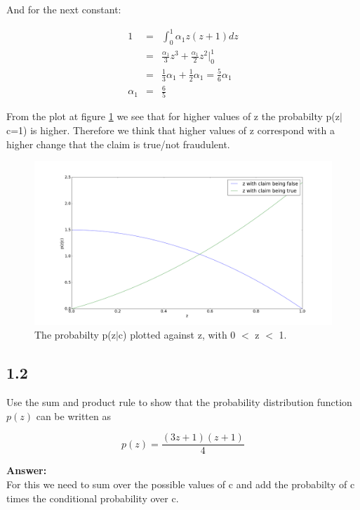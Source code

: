 \documentclass[a4paper]{article}
\begin{document}
And for the next constant:

\begin{eqnarray}
1 &=& \int_0^1 \alpha_1 z(z+1) dz\\
&=& \frac{\alpha_1}{3}z^3 + \frac{\alpha_1}{2}z^2 \Bigg |_0^1\\
&=& \frac{1}{3}\alpha_1 + \frac{1}{2}\alpha_1 = \frac{5}{6}\alpha_1\\
\alpha_1 &=& \frac{6}{5}
\end{eqnarray}

From the plot at figure \ref{Fig1.1} we see that for higher values of z the probabilty p(z$|$c=1) is higher. Therefore we think that higher values of z correspond with a higher change that the claim is true/not fraudulent.

\begin{figure}[H]
\includegraphics[width=\textwidth]{Exercise1,1.png}
\caption{ The probabilty p(z$|$c) plotted against z, with 0 $<$ z $<$ 1.}
\label{Fig1.1}
\end{figure}



\subsection*{1.2}

Use the sum and product rule to show that the probability distribution function $p(z)$ can be written as 

\begin{equation}
	p(z) = \frac{(3z + 1)(z + 1)}{4}
\end{equation}





\textbf{Answer:}\\

For this we need to sum over the possible values of c and add the probabilty of c times the conditional probability over c. 
\end{document}
